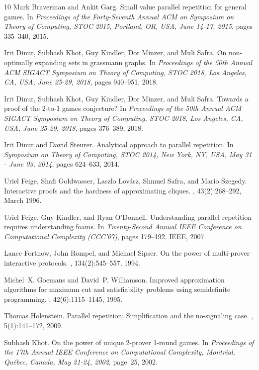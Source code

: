 \documentclass[10pt,a4paper]{article}
\begin{document}
\begin{thebibliography}{10}
Mark Braverman and Ankit Garg.
\newblock Small value parallel repetition for general games.
\newblock In {\em Proceedings of the Forty-Seventh Annual {ACM} on Symposium on
  Theory of Computing, {STOC} 2015, Portland, OR, USA, June 14-17, 2015}, pages
  335--340, 2015.

Irit Dinur, Subhash Khot, Guy Kindler, Dor Minzer, and Muli Safra.
\newblock On non-optimally expanding sets in grassmann graphs.
\newblock In {\em Proceedings of the 50th Annual {ACM} {SIGACT} Symposium on
  Theory of Computing, {STOC} 2018, Los Angeles, CA, USA, June 25-29, 2018},
  pages 940--951, 2018.

Irit Dinur, Subhash Khot, Guy Kindler, Dor Minzer, and Muli Safra.
\newblock Towards a proof of the 2-to-1 games conjecture?
\newblock In {\em Proceedings of the 50th Annual {ACM} {SIGACT} Symposium on
  Theory of Computing, {STOC} 2018, Los Angeles, CA, USA, June 25-29, 2018},
  pages 376--389, 2018.

Irit Dinur and David Steurer.
\newblock Analytical approach to parallel repetition.
\newblock In {\em Symposium on Theory of Computing, {STOC} 2014, New York, NY,
  USA, May 31 - June 03, 2014}, pages 624--633, 2014.

Uriel Feige, Shafi Goldwasser, Laszlo Lov\'{a}sz, Shmuel Safra, and Mario
  Szegedy.
\newblock Interactive proofs and the hardness of approximating cliques.
, 43(2):268--292, March 1996.

Uriel Feige, Guy Kindler, and Ryan O'Donnell.
\newblock Understanding parallel repetition requires understanding foams.
\newblock In {\em Twenty-Second Annual IEEE Conference on Computational
  Complexity (CCC'07)}, pages 179--192. IEEE, 2007.

Lance Fortnow, John Rompel, and Michael Sipser.
\newblock On the power of multi-prover interactive protocols.
, 134(2):545--557, 1994.

Michel~X. Goemans and David~P. Williamson.
\newblock Improved approximation algorithms for maximum cut and satisfiability
  problems using semidefinite programming.
, 42(6):1115--1145, 1995.

Thomas Holenstein.
\newblock Parallel repetition: Simplification and the no-signaling case.
, 5(1):141--172, 2009.

Subhash Khot.
\newblock On the power of unique 2-prover 1-round games.
\newblock In {\em Proceedings of the 17th Annual {IEEE} Conference on
  Computational Complexity, Montr{\'{e}}al, Qu{\'{e}}bec, Canada, May 21-24,
  2002}, page~25, 2002.


\end{thebibliography}
\end{document}
